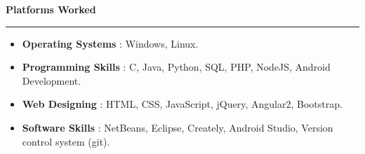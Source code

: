 \documentclass[a4paper,10pt]{article}
\begin{document}
\textbf{Platforms Worked} \\[-0.2cm] \indent \rule{49em}{0.4pt}
\begin{itemize}
\item \noindent \textbf{Operating Systems} : Windows, Linux.\\[-0.6cm]
\item \textbf{Programming Skills} : C, Java, Python, SQL, PHP, NodeJS, Android Development.\\[-0.6cm]
\item \textbf{Web Designing} : HTML, CSS, JavaScript, jQuery, Angular2, Bootstrap.\\[-0.6cm]
\item \textbf{Software Skills} : NetBeans, Eclipse, Creately, Android Studio, Version control system (git).\\[-0.6cm]
\end{itemize}
\end{document}

